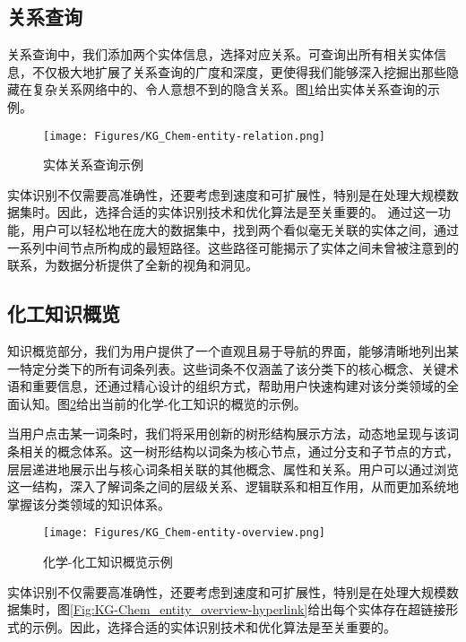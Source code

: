 \subsection{关系查询} 
关系查询中，我们添加两个实体信息，选择对应关系。可查询出所有相关实体信息，不仅极大地扩展了关系查询的广度和深度，更使得我们能够深入挖掘出那些隐藏在复杂关系网络中的、令人意想不到的隐含关系。图\ref{Fig:KG-Chem_entity_relation}给出实体关系查询的示例。

\begin{figure}[h!]
\centering
\texttt{[image: Figures/KG\_Chem-entity-relation.png]}
\caption{\small\textrm{实体关系查询示例}}%
\label{Fig:KG-Chem_entity_relation}
\end{figure}
实体识别不仅需要高准确性，还要考虑到速度和可扩展性，特别是在处理大规模数据集时。因此，选择合适的实体识别技术和优化算法是至关重要的。
通过这一功能，用户可以轻松地在庞大的数据集中，找到两个看似毫无关联的实体之间，通过一系列中间节点所构成的最短路径。这些路径可能揭示了实体之间未曾被注意到的联系，为数据分析提供了全新的视角和洞见。

\subsection{化工知识概览} 
知识概览部分，我们为用户提供了一个直观且易于导航的界面，能够清晰地列出某一特定分类下的所有词条列表。这些词条不仅涵盖了该分类下的核心概念、关键术语和重要信息，还通过精心设计的组织方式，帮助用户快速构建对该分类领域的全面认知。图\ref{Fig:KG-Chem_entity_overview}给出当前的化学-化工知识的概览的示例。

当用户点击某一词条时，我们将采用创新的树形结构展示方法，动态地呈现与该词条相关的概念体系。这一树形结构以词条为核心节点，通过分支和子节点的方式，层层递进地展示出与核心词条相关联的其他概念、属性和关系。用户可以通过浏览这一结构，深入了解词条之间的层级关系、逻辑联系和相互作用，从而更加系统地掌握该分类领域的知识体系。

\begin{figure}[h!]
\centering
\texttt{[image: Figures/KG\_Chem-entity-overview.png]}
\caption{\small\textrm{化学-化工知识概览示例}}%
\label{Fig:KG-Chem_entity_overview}
\end{figure}
实体识别不仅需要高准确性，还要考虑到速度和可扩展性，特别是在处理大规模数据集时，图\ref{Fig:KG-Chem_entity_overview-hyperlink}给出每个实体存在超链接形式的示例。因此，选择合适的实体识别技术和优化算法是至关重要的。

